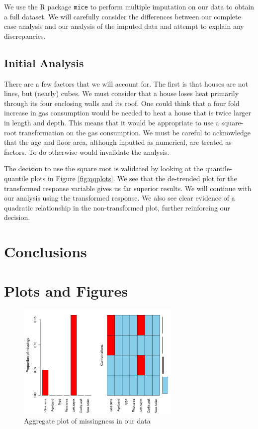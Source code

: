 \documentclass[11pt]{article}
\begin{document}
We use the R package \texttt{mice} to perform multiple imputation on our data to obtain a full dataset. We will carefully consider the differences between our complete case analysis and our analysis of the imputed data and attempt to explain any discrepancies. 

\subsection{Initial Analysis}

There are a few factors that we will account for. The first is that houses are not lines, but (nearly) cubes. We must consider that a house loses heat primarily through its four enclosing walls and its roof. One could think that a four fold increase in gas consumption would be needed to heat a house that is twice larger in length and depth. This means that it would be appropriate to use a square-root transformation on the gas consumption. We must be careful to acknowledge that the age and floor area, although inputted as numerical, are treated as factors. To do otherwise would invalidate the analysis.

The decision to use the square root is validated by looking at the quantile-quantile plots in Figure \ref{fig:qqplots}. We see that the de-trended plot for the transformed response variable gives us far superior results. We will continue with our analysis using the transformed response. We also see clear evidence of a quadratic relationship in the non-transformed plot, further reinforcing our decision.
\section{Conclusions}



\appendix

\section{Plots and Figures}

\begin{figure}[H]
	\centering
	\includegraphics[width=0.7\textwidth]{aggre_missplot}
	\caption{Aggregate plot of missingness in our data}
	\label{fig:aggrmiss}
\end{figure}
\end{document}
